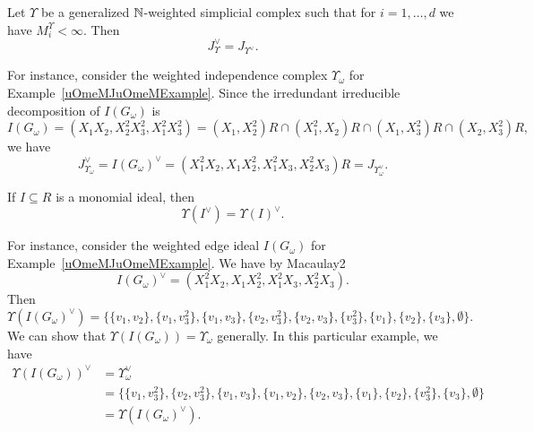 \documentclass{article}
\begin{document}
\begin{theorem}
    Let $\Upsilon$ be a generalized $\mathbb{N}$-weighted simplicial complex such that for $i = 1,\dots,d$ we have $M_i^\Upsilon < \infty$. Then
    \[J_{\Upsilon}^\vee = J_{\Upsilon^\vee}.\]
\end{theorem}

For instance, consider the weighted independence complex $\Upsilon_\omega$ for Example~\ref{uOmeMJuOmeMExample}. Since the irredundant irreducible decomposition of $I(G_\omega)$ is 
\[I(G_\omega) = (X_1X_2,X_2^2X_3^2,X_1^2X_3^2) = (X_1,X_2^2)R \cap (X_1^2,X_2)R \cap (X_1,X_3^2)R \cap (X_2,X_3^2)R,\]
we have
\[J_{\Upsilon_\omega}^\vee = I(G_\omega)^\vee = (X_1^2X_2,X_1X_2^2,X_1^2X_3,X_2^2X_3)R = J_{\Upsilon_\omega^\vee}.\]

\begin{theorem}
    If $I \subseteq R$ is a monomial ideal, then 
    \[\Upsilon(I^\vee) = \Upsilon(I)^\vee.\]
\end{theorem}
    For instance, consider the weighted edge ideal $I(G_\omega)$ for Example~\ref{uOmeMJuOmeMExample}. We have by Macaulay2
    \[I(G_\omega)^\vee = (X_1^2X_2,X_1X_2^2,X_1^2X_3,X_2^2X_3).\]
Then 
\[\Upsilon(I(G_\omega)^\vee) = \{\{v_1,v_2\},\{v_1,v_3^2\},\{v_1,v_3\},\{v_2,v_3^2\},\{v_2,v_3\},\{v_3^2\},\{v_1\},\{v_2\},\{v_3\}, \emptyset\}.\]
We can show that $\Upsilon(I(G_\omega)) = \Upsilon_\omega$ generally. In this particular example, we have
    \begin{align*}
        \Upsilon(I(G_\omega))^\vee &= \Upsilon_\omega^\vee \\
        &= \{\{v_1,v_3^2\},\{v_2,v_3^2\},\{v_1,v_3\},\{v_1,v_2\},\{v_2,v_3\},\{v_1\},\{v_2\},\{v_3^2\},\{v_3\},\emptyset\} \\
        &= \Upsilon(I(G_\omega)^\vee).
    \end{align*}
\end{document}
